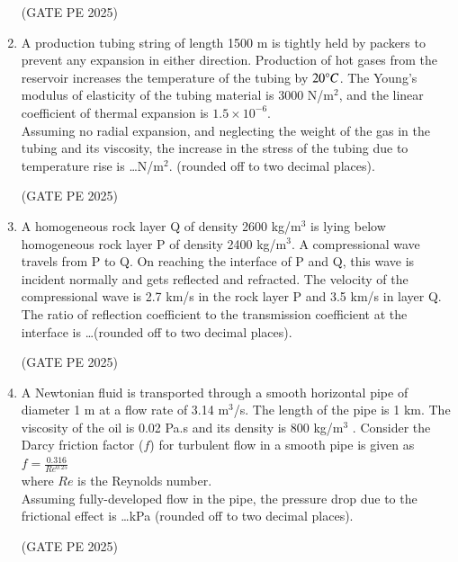 \documentclass[journal,12pt,onecolumn]{IEEEtran}
\theoremstyle{remark}
\begin{document}
\begin{enumerate}
\hfill{(GATE PE 2025)}

\item A production tubing string of length 1500 m is tightly held by packers to prevent any expansion in either direction. Production of hot gases from the reservoir increases the temperature of the tubing by $20\degree C$. The Young's modulus of elasticity
of the tubing material is 3000 N/m$^2$, and the linear coefficient of thermal expansion is $1.5\times 10^{-6}$.\\
Assuming no radial expansion, and neglecting the weight of the gas in the tubing and its viscosity, the increase in the stress of the tubing due to temperature rise is \dots N/m$^2$. (rounded off to two decimal places).

\hfill{(GATE PE 2025)}


\item A homogeneous rock layer Q of density 2600 kg/m$^3$ is lying below homogeneous rock layer P of density 2400 kg/m$^3$. A compressional wave travels from P to Q. On reaching the interface of P and Q, this wave is incident normally and gets reflected
and refracted. The velocity of the compressional wave is 2.7 km/s in the rock layer P and 3.5 km/s in layer Q.\\
The ratio of reflection coefficient to the transmission coefficient at the interface is \dots(rounded off to two decimal places).

\hfill{(GATE PE 2025)}


\item A Newtonian fluid is transported through a smooth horizontal pipe of diameter 1 m at a flow rate of 3.14 m$^3$/s. The length of the pipe is 1 km. The viscosity of the oil is 0.02 Pa.s and its density is 800 kg/m$^3$ . Consider the Darcy friction factor ($f$) for turbulent flow in a smooth pipe is given as\\
$f=\frac{0.316}{Re^{0.25}}$\\
where $Re$ is the Reynolds number.\\
Assuming fully-developed flow in the pipe, the pressure drop due to the frictional effect is \dots kPa (rounded off to two decimal places).

\hfill{(GATE PE 2025)}





















\end{enumerate}
\end{document}

